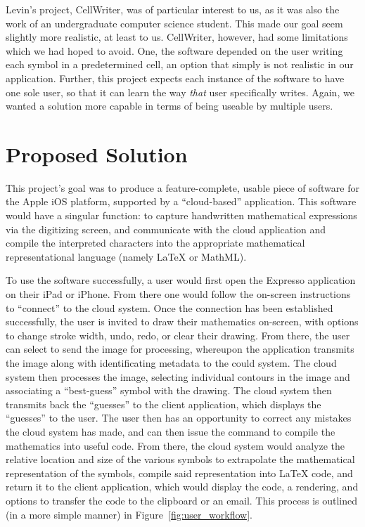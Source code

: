 \documentclass{acm_proc_article-sp}
\begin{document}
Levin's project, CellWriter, was of particular interest to us, as it was also the work of an undergraduate computer science student. This made our goal seem slightly more realistic, at least to us. CellWriter, however, had some limitations which we had hoped to avoid. One, the software depended on the user writing each symbol in a predetermined cell, an option that simply is not realistic in our application. Further, this project expects each instance of the software to have one sole user, so that it can learn the way \emph{that} user specifically writes. Again, we wanted a solution more capable in terms of being useable by multiple users.

\section{Proposed Solution}
This project's goal was to produce a feature-complete, usable piece of software for the Apple iOS platform, supported by a ``cloud-based'' application. This software would have a singular function: to capture handwritten mathematical expressions via the digitizing screen, and communicate with the cloud application and compile the interpreted characters into the appropriate mathematical representational language (namely \LaTeX{} or MathML).

To use the software successfully, a user would first open the Expresso application on their iPad or iPhone. From there one would follow the on-screen instructions to ``connect'' to the cloud system. Once the connection has been established successfully, the user is invited to draw their mathematics on-screen, with options to change stroke width, undo, redo, or clear their drawing. From there, the user can select to send the image for processing, whereupon the application transmits the image along with identificating metadata to the could system. The cloud system then processes the image, selecting individual contours in the image and associating a ``best-guess'' symbol with the drawing. The cloud system then transmits back the ``guesses'' to the client application, which displays the ``guesses'' to the user. The user then has an opportunity to correct any mistakes the cloud system has made, and can then issue the command to compile the mathematics into useful code. From there, the cloud system would analyze the relative location and size of the various symbols to extrapolate the mathematical representation of the symbols, compile said representation into \LaTeX{} code, and return it to the client application, which would display the code, a rendering, and options to transfer the code to the clipboard or an email. This process is outlined (in a more simple manner) in Figure~\ref{fig:user_workflow}.
\end{document}
